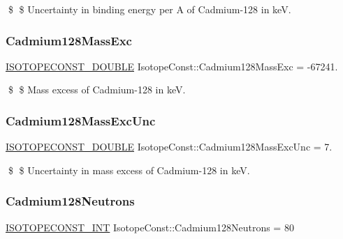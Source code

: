\$ \$ Uncertainty in binding energy per A of Cadmium-\/128 in keV. \mbox{\label{group___isotope_const-_cadmium-_cd128_gaf814c95fb1ae8e9abec29b64c6a37596}} 
\subsubsection{\texorpdfstring{Cadmium128\+Mass\+Exc}{Cadmium128MassExc}}
{\footnotesize\ttfamily \mbox{\hyperlink{group___isotope_const-_macros_ga8f45a7272ce02c0b4c65c44636ed719a}{I\+S\+O\+T\+O\+P\+E\+C\+O\+N\+S\+T\+\_\+\+D\+O\+U\+B\+LE}} Isotope\+Const\+::\+Cadmium128\+Mass\+Exc = -\/67241.}

\$ \$ Mass excess of Cadmium-\/128 in keV. \mbox{\label{group___isotope_const-_cadmium-_cd128_ga3c581343cf114a6d01fcab763ed17840}} 
\subsubsection{\texorpdfstring{Cadmium128\+Mass\+Exc\+Unc}{Cadmium128MassExcUnc}}
{\footnotesize\ttfamily \mbox{\hyperlink{group___isotope_const-_macros_ga8f45a7272ce02c0b4c65c44636ed719a}{I\+S\+O\+T\+O\+P\+E\+C\+O\+N\+S\+T\+\_\+\+D\+O\+U\+B\+LE}} Isotope\+Const\+::\+Cadmium128\+Mass\+Exc\+Unc = 7.}

\$ \$ Uncertainty in mass excess of Cadmium-\/128 in keV. \mbox{\label{group___isotope_const-_cadmium-_cd128_ga3cb1fce2c4b9674933c5c569366e28cb}} 
\subsubsection{\texorpdfstring{Cadmium128\+Neutrons}{Cadmium128Neutrons}}
{\footnotesize\ttfamily \mbox{\hyperlink{group___isotope_const-_macros_ga5f18360b3e99483a35c32d789e62621c}{I\+S\+O\+T\+O\+P\+E\+C\+O\+N\+S\+T\+\_\+\+I\+NT}} Isotope\+Const\+::\+Cadmium128\+Neutrons = 80}

